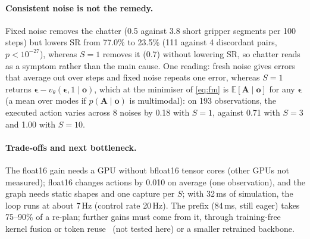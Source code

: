 \paragraph{Consistent noise is not the remedy.}
Fixed noise removes the chatter (0.5 against 3.8 short gripper segments per 100 steps) but lowers SR from 77.0\% to 23.5\% (111 against 4 discordant pairs, $p<10^{-27}$), whereas $S{=}1$ removes it (0.7) without lowering SR, so chatter reads as a symptom rather than the main cause.
One reading: fresh noise gives errors that average out over steps and fixed noise repeats one error, whereas $S{=}1$ returns $\boldsymbol\epsilon-v_\theta(\boldsymbol\epsilon,1\mid\mathbf o)$, which at the minimiser of \cref{eq:fm} is $\mathbb E[\mathbf A\mid\mathbf o]$ for any $\boldsymbol\epsilon$ (a mean over modes if $p(\mathbf A\mid\mathbf o)$ is multimodal): on 193 observations, the executed action varies across 8 noises by 0.18 with $S{=}1$, against 0.71 with $S{=}3$ and 1.00 with $S{=}10$.

\paragraph{Trade-offs and next bottleneck.}
The float16 gain needs a GPU without bfloat16 tensor cores (other GPUs not measured); float16 changes actions by 0.010 on average (one observation), and the graph needs static shapes and one capture per $S$; with 32\,ms of simulation, the loop runs at about 7\,Hz (control rate 20\,Hz).
The prefix (84\,ms, still eager) takes 75--90\% of a re-plan; further gains must come from it, through training-free kernel fusion or token reuse~\cite{ma2025running,xu2026vla} (not tested here) or a smaller retrained backbone.
